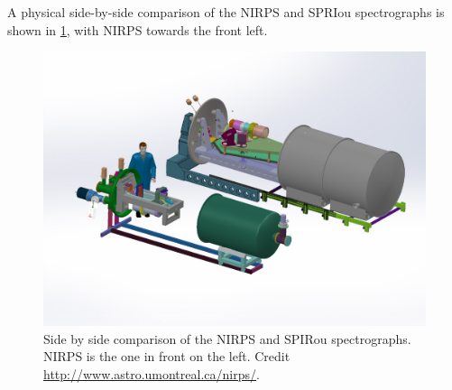 A physical side-by-side comparison of the {NIRPS} and {SPRIou} spectrographs is shown in \cref{fig:nirps-vs-spirou}, with {NIRPS} towards the front left.
\begin{figure}
    \centering
    \includegraphics[width=0.7\linewidth]{figures/spectroscopy/NIRPS-vs-SPIROU}
    \caption{Side by side comparison of the {NIRPS} and {SPIRou} spectrographs.
        {NIRPS} is the one in front on the left.
        Credit \href{http://www.astro.umontreal.ca/nirps/}{http://www.astro.umontreal.ca/nirps/}.}
    \label{fig:nirps-vs-spirou}
\end{figure}
